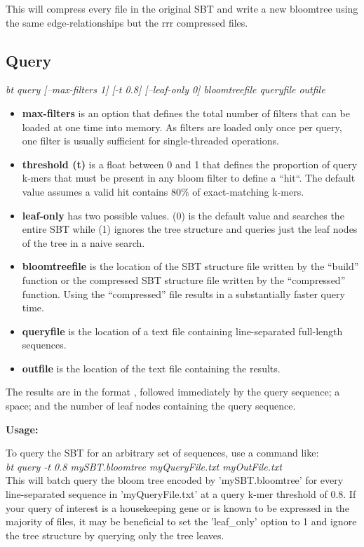 \documentclass{article}
\begin{document}
This will compress every file in the original SBT and write a new bloomtree using the same edge-relationships but the rrr compressed files.


\subsection{Query}
\textit{bt query [--max-filters 1] [-t 0.8] [--leaf-only 0] bloomtreefile queryfile outfile}
\begin{itemize}
\item \textbf{max-filters} is an option that defines the total number of filters that can be loaded at one time into memory. As filters are loaded only once per query, one filter is usually sufficient for single-threaded operations.
\item \textbf{threshold (t)} is a float between 0 and 1 that defines the proportion of query k-mers that must be present in any bloom filter to define a ``hit``. The default value assumes a valid hit contains 80\% of exact-matching k-mers.
\item \textbf{leaf-only} has two possible values. (0) is the default value and searches the entire SBT while (1) ignores the tree structure and queries just the leaf nodes of the tree in a naive search.
\item \textbf{bloomtreefile} is the location of the SBT structure file written by the ``build'' function or the compressed SBT structure file written by the ``compressed'' function. Using the ``compressed'' file results in a substantially faster query time.
\item \textbf{queryfile} is the location of a text file containing line-separated full-length sequences.
\item \textbf{outfile} is the location of the text file containing the results.
\end{itemize}

The results are in the format {\tt *}, followed immediately by the query sequence; a space; and the number of leaf nodes containing the query sequence.

\textbf{Usage:}

To query the SBT for an arbitrary set of sequences, use a command like: \\

\textit{bt query -t 0.8 mySBT.bloomtree myQueryFile.txt myOutFile.txt} \\

This will batch query the bloom tree encoded by 'mySBT.bloomtree' for every line-separated sequence in 'myQueryFile.txt' at a query k-mer threshold of 0.8. If your query of interest is a housekeeping gene or is known to be expressed in the majority of files, it may be beneficial to set the 'leaf\_only' option to 1 and ignore the tree structure by querying only the tree leaves. 
\end{document}
